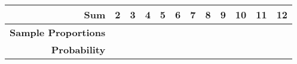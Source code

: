 \documentclass[convert]{standalone}
\begin{document}
    
\begin{tabular}{|r|c|c|c|c|c|c|c|c|c|c|c|}
\hline
\textbf{Sum}                & \textbf{2} & \textbf{3} & \textbf{4} & \textbf{5} & \textbf{6} & \textbf{7} & \textbf{8} & \textbf{9} & \textbf{10} & \textbf{11} & \textbf{12} \\ \hline
\textbf{Sample Proportions} &            &            &            &            &            &            &            &            &             &             &             \\ \hline
\textbf{Probability}        &            &            &            &            &            &            &            &            &             &             &             \\ \hline
\end{tabular}
\end{document}
